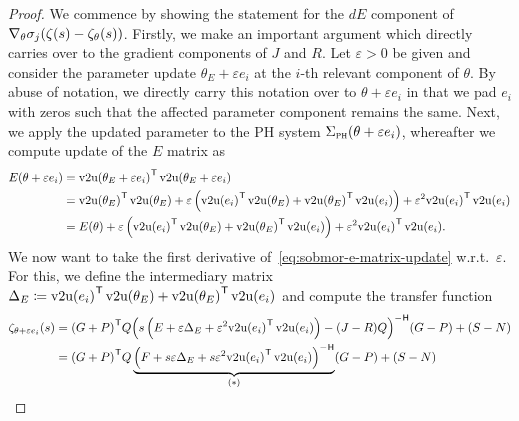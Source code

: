 \begin{proof}
    We commence by showing the statement for the $dE$ component of $\nabla_\theta \sigma_j(\zeta(s) - \zeta_\theta(s))$.
    Firstly, we make an important argument which directly carries over to the gradient components of $J$ and $R$.
    Let $\varepsilon > 0$ be given and consider the parameter update $\theta_E + \varepsilon e_i$ at the $i$-th relevant component of $\theta$.
    By abuse of notation, we directly carry this notation over to $\theta + \varepsilon e_i$ in that we pad $e_i$ with zeros such that the affected parameter component remains the same.
    Next, we apply the updated parameter to the \ac{PH} system $\Sigma_{\textnormal{\scshape ph}}(\theta + \varepsilon e_i)$, whereafter we compute update of the $E$ matrix as
    \begin{equation}\label{eq:sobmor-e-matrix-update}
        \begin{aligned}
            E(\theta + \varepsilon e_i) &= {\vecupper(\theta_E + \varepsilon e_i)}\trans \vecupper(\theta_E + \varepsilon e_i) \\
             &= {\vecupper(\theta_E)}\trans \vecupper(\theta_E) + \varepsilon \left( {\vecupper(e_i)}\trans \vecupper(\theta_E) + {\vecupper(\theta_E)}\trans \vecupper(e_i) \right) + \varepsilon^2 {\vecupper(e_i)}\trans \vecupper(e_i) \\
             &= E(\theta) + \varepsilon \left( {\vecupper(e_i)}\trans \vecupper(\theta_E) + {\vecupper(\theta_E)}\trans \vecupper(e_i) \right) + \varepsilon^2 {\vecupper(e_i)}\trans \vecupper(e_i).
        \end{aligned}
    \end{equation}
    We now want to take the first derivative of~\eqref{eq:sobmor-e-matrix-update} w.r.t.\ $\varepsilon$.
    For this, we define the intermediary matrix $\Delta_E \coloneqq {\mathop{}\!\mathrm{v}2\mathrm{u}(e_i)}^{\mkern1mu \mathsf{T}} \mathop{}\!\mathrm{v}2\mathrm{u}(\theta_E) + {\mathop{}\!\mathrm{v}2\mathrm{u}(\theta_E)}^{\mkern1mu \mathsf{T}} \mathop{}\!\mathrm{v}2\mathrm{u}(e_i)$ and compute the transfer function
    \begin{equation}\label{eq:sobmor-e-variation}
        \begin{aligned}
            \tfunc_{\theta + \varepsilon e_i}(s) &= {(G + P)}\trans Q {\left( s \left( E + \varepsilon \Delta_E + \varepsilon^2 {\vecupper(e_i)}\trans \vecupper(e_i) \right) - (J - R) Q \right)}\inv (G - P) + (S - N) \\
             &= {(G + P)}\trans Q \underbrace{{\left( F + s \varepsilon \Delta_E + s \varepsilon^2 {\vecupper(e_i)}\trans \vecupper(e_i) \right)}\inv}_{(*)} (G - P) + (S - N)
        \end{aligned}

\end{equation}
\end{proof}
